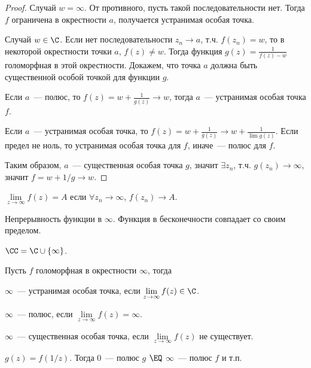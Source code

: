 \begin{proof}
    Случай $w = \infty$.
    От противного, пусть такой последовательности нет.
    Тогда $f$ ограничена в окрестности $a$,
    получается устранимая особая точка.

    Случай $w \in \C$.
    Если нет последовательности $z_n \to a$,
    т.ч. $f(z_n) = w$, то в некоторой окрестности
    точки $a$, $f(z) \ne w$. Тогда функция
    $g(z) = \frac{1}{f(z) - w}$ голоморфная в
    этой окрестности.
    Докажем, что точка $a$ должна быть существенной
    особой точкой для функции $g$.

    Если $a$~--- полюс, то $f(z) = w + \frac{1}{g(z)}
        \to w$, тогда $a$~--- устранимая особая точка $f$.

    Если $a$~--- устранимая особая точка, то
    $f(z) = w + \frac{1}{g(z)} \to w + \frac{1}{\lim g(z)}$.
    Если предел не ноль, то устранимая особая точка для $f$,
    иначе~--- полюс для $f$.

    Таким образом, $a$~--- существенная особая точка $g$,
    значит $\exists z_n$, т.ч. $g(z_n) \to \infty$,
    значит $f = w + 1/g \to w$.
\end{proof}

\begin{definition}
    $\lim\limits_{z\to\infty} f(z) = A$
    если $\forall z_n \to \infty$, $f(z_n) \to A$.
\end{definition}

\begin{definition}
    Непрерывность функции в $\infty$.
    Функция в бесконечности совпадает со своим пределом.
\end{definition}

\begin{notation}
    $\CC = \C \cup \left\{\infty\right\}$.
\end{notation}

\begin{definition}
    Пусть $f$ голоморфная в окрестности $\infty$, тогда

    $\infty$~--- устранимая особая точка, если
    $\lim\limits_{z\to\infty} f(z) \in \C$.

    $\infty$~--- полюс, если
    $\lim\limits_{z\to\infty} f(z) = \infty$.

    $\infty$~--- существенная особая точка, если
    $\lim\limits_{z\to\infty} f(z)$ не существует.
\end{definition}

\begin{observation}
    $g(z) = f(1/z)$. Тогда $0$~--- полюс $g$
    $\EQ$ $\infty$~--- полюс $f$ и т.п.
\end{observation}

